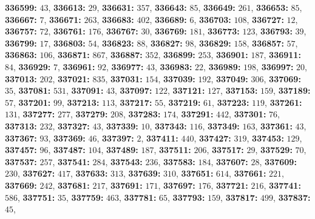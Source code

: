 \textsf{\bfseries 336599:} $43$, \textsf{\bfseries 336613:} $29$, \textsf{\bfseries 336631:} $357$, \textsf{\bfseries 336643:} $85$, \textsf{\bfseries 336649:} $261$, \textsf{\bfseries 336653:} $85$, \textsf{\bfseries 336667:} $7$, \textsf{\bfseries 336671:} $263$, \textsf{\bfseries 336683:} $402$, \textsf{\bfseries 336689:} $6$, \textsf{\bfseries 336703:} $108$, \textsf{\bfseries 336727:} $12$, \textsf{\bfseries 336757:} $72$, \textsf{\bfseries 336761:} $176$, \textsf{\bfseries 336767:} $30$, \textsf{\bfseries 336769:} $181$, \textsf{\bfseries 336773:} $123$, \textsf{\bfseries 336793:} $39$, \textsf{\bfseries 336799:} $17$, \textsf{\bfseries 336803:} $54$, \textsf{\bfseries 336823:} $88$, \textsf{\bfseries 336827:} $98$, \textsf{\bfseries 336829:} $158$, \textsf{\bfseries 336857:} $57$, \textsf{\bfseries 336863:} $106$, \textsf{\bfseries 336871:} $867$, \textsf{\bfseries 336887:} $352$, \textsf{\bfseries 336899:} $253$, \textsf{\bfseries 336901:} $187$, \textsf{\bfseries 336911:} $84$, \textsf{\bfseries 336929:} $7$, \textsf{\bfseries 336961:} $92$, \textsf{\bfseries 336977:} $43$, \textsf{\bfseries 336983:} $22$, \textsf{\bfseries 336989:} $198$, \textsf{\bfseries 336997:} $20$, \textsf{\bfseries 337013:} $202$, \textsf{\bfseries 337021:} $835$, \textsf{\bfseries 337031:} $154$, \textsf{\bfseries 337039:} $192$, \textsf{\bfseries 337049:} $306$, \textsf{\bfseries 337069:} $35$, \textsf{\bfseries 337081:} $531$, \textsf{\bfseries 337091:} $43$, \textsf{\bfseries 337097:} $122$, \textsf{\bfseries 337121:} $127$, \textsf{\bfseries 337153:} $159$, \textsf{\bfseries 337189:} $57$, \textsf{\bfseries 337201:} $99$, \textsf{\bfseries 337213:} $113$, \textsf{\bfseries 337217:} $55$, \textsf{\bfseries 337219:} $61$, \textsf{\bfseries 337223:} $119$, \textsf{\bfseries 337261:} $131$, \textsf{\bfseries 337277:} $277$, \textsf{\bfseries 337279:} $208$, \textsf{\bfseries 337283:} $174$, \textsf{\bfseries 337291:} $442$, \textsf{\bfseries 337301:} $76$, \textsf{\bfseries 337313:} $232$, \textsf{\bfseries 337327:} $43$, \textsf{\bfseries 337339:} $10$, \textsf{\bfseries 337343:} $116$, \textsf{\bfseries 337349:} $163$, \textsf{\bfseries 337361:} $43$, \textsf{\bfseries 337367:} $93$, \textsf{\bfseries 337369:} $46$, \textsf{\bfseries 337397:} $2$, \textsf{\bfseries 337411:} $440$, \textsf{\bfseries 337427:} $319$, \textsf{\bfseries 337453:} $129$, \textsf{\bfseries 337457:} $96$, \textsf{\bfseries 337487:} $104$, \textsf{\bfseries 337489:} $187$, \textsf{\bfseries 337511:} $206$, \textsf{\bfseries 337517:} $29$, \textsf{\bfseries 337529:} $70$, \textsf{\bfseries 337537:} $257$, \textsf{\bfseries 337541:} $284$, \textsf{\bfseries 337543:} $236$, \textsf{\bfseries 337583:} $184$, \textsf{\bfseries 337607:} $28$, \textsf{\bfseries 337609:} $230$, \textsf{\bfseries 337627:} $417$, \textsf{\bfseries 337633:} $313$, \textsf{\bfseries 337639:} $310$, \textsf{\bfseries 337651:} $614$, \textsf{\bfseries 337661:} $221$, \textsf{\bfseries 337669:} $242$, \textsf{\bfseries 337681:} $217$, \textsf{\bfseries 337691:} $171$, \textsf{\bfseries 337697:} $176$, \textsf{\bfseries 337721:} $216$, \textsf{\bfseries 337741:} $586$, \textsf{\bfseries 337751:} $35$, \textsf{\bfseries 337759:} $463$, \textsf{\bfseries 337781:} $65$, \textsf{\bfseries 337793:} $159$, \textsf{\bfseries 337817:} $499$, \textsf{\bfseries 337837:} $45$, 
